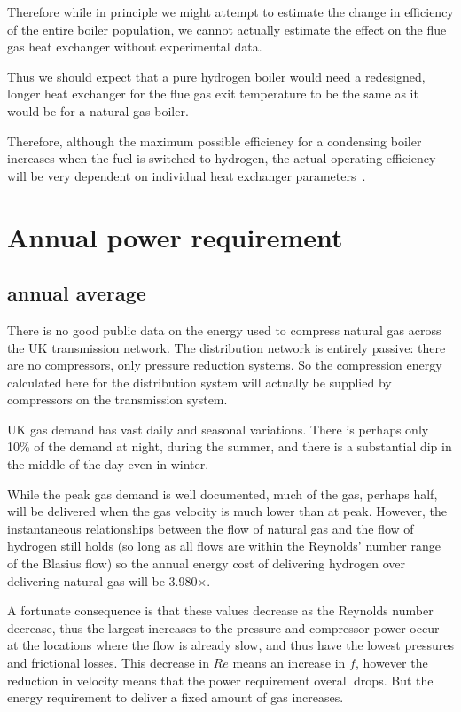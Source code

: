 \documentclass[5p]{elsarticle} %
\begin{document}
 Therefore while in principle we might attempt to estimate the change in efficiency of the entire boiler population, we cannot actually estimate the effect on the flue gas heat exchanger without experimental data.

Thus we should expect that a pure hydrogen boiler would need a redesigned, longer heat exchanger for the flue gas exit temperature to be the same as it would be for a natural gas boiler.

Therefore, although the maximum possible efficiency for a condensing boiler increases when the fuel is switched to hydrogen, the actual operating efficiency will be very dependent on individual heat exchanger parameters~\citep{DESNZ2023b, GASTEC2009}.



\section{Annual power requirement}
\subsection{annual average}
There is no good public data on the energy used to compress natural gas across the UK transmission network. 
The distribution network is entirely passive: there are no compressors, only pressure reduction systems. So the compression energy calculated here for the distribution system will actually be supplied by compressors on the transmission system.

UK gas demand has vast daily and seasonal variations. There is perhaps only 10\% of the demand at night, during the summer, and there is a substantial dip in the middle of the day even in winter.

While the peak gas demand is well documented, much of the gas, perhaps half, will be delivered when the gas velocity is much lower than at peak. However, the instantaneous relationships between the flow of natural gas and the flow of hydrogen still holds (so long as all flows are within the Reynolds' number range of the Blasius flow) so the annual energy cost of delivering hydrogen over delivering natural gas will be 3.980$\times$.

A fortunate consequence is that these values decrease as the Reynolds number decrease, thus the largest increases to the pressure and compressor power occur at the locations where the flow is already slow, and thus have the lowest pressures and frictional losses.
This decrease in $Re$ means an increase in $f$, however the reduction in velocity means that the power requirement overall drops. But the energy requirement to deliver a fixed amount of gas increases.
\end{document}
